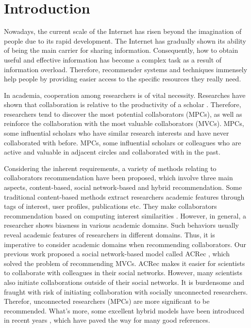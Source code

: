 \documentclass[review]{elsarticle}
\begin{document}
\linenumbers


\section{Introduction}
Nowadays, the current scale of the Internet has risen beyond the imagination of people due to its rapid development. The Internet has gradually shown its ability of being the main carrier for sharing information. Consequently, how to obtain useful and effective information has become a complex task as a result of information overload. Therefore, recommender systems and techniques immensely help people by providing easier access to the specific resources they really need.

In academia, cooperation among researchers is of vital necessity. Researches have shown that collaboration is relative to the productivity of a scholar \cite{lee2005impact}. Therefore, researchers tend to discover the most potential collaborators (MPCs), as well as reinforce the collaboration with the most valuable collaborators (MVCs). MPCs, some influential scholars who have similar research interests and have never collaborated with before. MPCs, some influential scholars or colleagues who are active and valuable in adjacent circles and collaborated with in the past.

Considering the inherent requirements, a variety of methods relating to collaborators recommendation have been proposed, which involve three main aspects, content-based, social network-based and hybrid recommendation. Some traditional content-based methods extract researchers academic features through tags of interest, user profiles, publications etc. They make collaborators recommendation based on computing interest similarities \cite{lopes2010collaboration,gollapalli2012similar,kim2010collaborative}. However, in general, a researcher shows biasness in various academic domains. Such behaviors usually reveal academic features of researchers in different domains. Thus, it is imperative to consider academic domains when recommending collaborators. Our previous work proposed a social network-based model called ACRec \cite{li2014acrec}, which solved the problem of recommending MVCs. ACRec makes it easier for scientists to collaborate with colleagues in their social networks. However, many scientists also initiate collaborations outside of their social networks. It is burdensome and fraught with risk of initiating collaboration with socially unconnected researchers. Therefor, unconnected researchers (MPCs) are more significant to be recommended. What's more, some excellent hybrid models have been introduced in recent years \cite{lee2011recommending,chen2011collabseer,cohen2013recommending}, which have paved the way for many good references.
\end{document}
